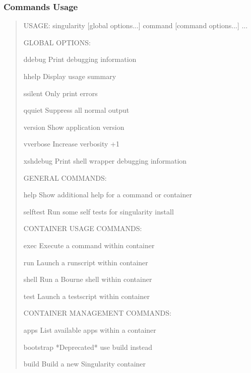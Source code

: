 \documentclass[letterpaper,10pt,english]{sphinxmanual}
\begin{document}
\subsubsection{Commands Usage}
\label{\detokenize{appendix:commands-usage}}\begin{quote}

\def\sphinxLiteralBlockLabel{\label{\detokenize{appendix:sec-commandsusage}}}
%
\begin{sphinxVerbatim}[commandchars=\\\{\}]
USAGE: singularity [global options...] \PYGZlt{}command\PYGZgt{} [command options...] ...


GLOBAL OPTIONS:

    \PYGZhy{}d\textbar{}\PYGZhy{}\PYGZhy{}debug    Print debugging information

    \PYGZhy{}h\textbar{}\PYGZhy{}\PYGZhy{}help     Display usage summary

    \PYGZhy{}s\textbar{}\PYGZhy{}\PYGZhy{}silent   Only print errors

    \PYGZhy{}q\textbar{}\PYGZhy{}\PYGZhy{}quiet    Suppress all normal output

       \PYGZhy{}\PYGZhy{}version  Show application version

    \PYGZhy{}v\textbar{}\PYGZhy{}\PYGZhy{}verbose  Increase verbosity +1

    \PYGZhy{}x\textbar{}\PYGZhy{}\PYGZhy{}sh\PYGZhy{}debug Print shell wrapper debugging information


GENERAL COMMANDS:

    help       Show additional help for a command or container

    selftest   Run some self tests for singularity install


CONTAINER USAGE COMMANDS:

    exec       Execute a command within container

    run        Launch a runscript within container

    shell      Run a Bourne shell within container

    test       Launch a testscript within container


CONTAINER MANAGEMENT COMMANDS:

    apps       List available apps within a container

    bootstrap  *Deprecated* use build instead

    build      Build a new Singularity container


\end{sphinxVerbatim}
\end{quote}
\end{document}
